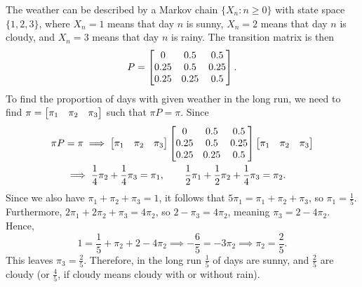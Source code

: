 \documentclass{homework}
\begin{document}
	 The weather can be described by a Markov chain $\{X_n : n \ge 0\}$ with state space $\{1,2,3\}$, where $X_n = 1$ means that day $n$ is sunny, $X_n = 2$ means that day $n$ is cloudy, and $X_n = 3$ means that day $n$ is rainy. The transition matrix is then
	\begin{equation*}
		P = \left[\begin{matrix}0 & 0.5 & 0.5\\ 0.25 & 0.5 & 0.25 \\ 0.25 & 0.25 & 0.5\end{matrix}\right].
	\end{equation*}
	To find the proportion of days with given weather in the long run, we need to find $\pi = \left[\begin{matrix}\pi_1 & \pi_2 & \pi_3\end{matrix}\right]$ such that $\pi P = \pi$. Since
	\begin{align*}
		\pi P &= \pi \implies \left[\begin{matrix}\pi_1 & \pi_2 & \pi_3\end{matrix}\right] \left[\begin{matrix}0 & 0.5 & 0.5\\ 0.25 & 0.5 & 0.25 \\ 0.25 & 0.25 & 0.5\end{matrix}\right] \left[\begin{matrix}\pi_1 & \pi_2 & \pi_3\end{matrix}\right] \\
		& \implies \frac{1}{4}\pi_2 + \frac{1}{4}\pi_3 = \pi_1, \qquad \frac{1}{2}\pi_1 + \frac{1}{2}\pi_2 + \frac{1}{4}\pi_3 = \pi_2.
	\end{align*}
	Since we also have $\pi_1 + \pi_2 + \pi_3 = 1$, it follows that $5\pi_1 = \pi_1 + \pi_2 + \pi_3$, so $\pi_1 = \frac{1}{5}$. Furthermore, $2\pi_1 + 2\pi_2 + \pi_3 = 4\pi_2$, so $2 - \pi_3 = 4\pi_2$, meaning $\pi_3 = 2-4\pi_2$. Hence,
	\begin{equation*}
		1 = \frac{1}{5} + \pi_2 + 2-4\pi_2 \implies -\frac{6}{5} = -3\pi_2 \implies \pi_2 = \frac{2}{5}.
	\end{equation*}
	This leaves $\pi_3 = \frac{2}{5}$. Therefore, in the long run $\frac{1}{5}$ of days are sunny, and $\frac{2}{5}$ are cloudy (or $\frac{4}{5}$, if cloudy means cloudy with or without rain).
	
\end{document}
